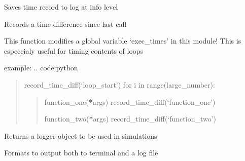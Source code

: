 \documentclass[letterpaper,10pt,english]{sphinxmanual}
\begin{document}

\begin{fulllineitems}
\label{\detokenize{modules/logging_setup:logging_setup.log_call}}
\end{fulllineitems}


\begin{fulllineitems}
\label{\detokenize{modules/logging_setup:logging_setup.logg_time_record}}
Saves time record to log at info level

\end{fulllineitems}


\begin{fulllineitems}
\label{\detokenize{modules/logging_setup:logging_setup.record_time_diff}}
Records a time difference since last call

This function modifies a global variable ‘exec\_times’ in this module!
This is especcialy useful for timing contents of loops

example:
.. code:python
\begin{quote}

record\_time\_diff(‘loop\_start’)
for i in range(large\_number):
\begin{quote}

function\_one({\color{red}\bfseries{}*}args)
record\_time\_diff(‘function\_one’)

function\_two({\color{red}\bfseries{}*}args)
record\_time\_diff(‘function\_two’)
\end{quote}
\end{quote}

\end{fulllineitems}


\begin{fulllineitems}
\label{\detokenize{modules/logging_setup:logging_setup.setup_logging}}
Returns a logger object to be used in simulations

Formats to output both to terminal and a log file

\end{fulllineitems}
\end{document}
